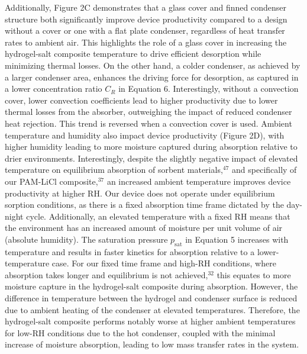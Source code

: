 \documentclass[11pt]{article}
\begin{document}
Additionally, Figure 2C demonstrates that a glass cover and finned condenser structure both significantly improve device productivity compared to a design without a cover or one with a flat plate condenser, regardless of heat transfer rates to ambient air. This highlights the role of a glass cover in increasing the hydrogel-salt composite temperature to drive efficient desorption while minimizing thermal losses. On the other hand, a colder condenser, as achieved by a larger condenser area, enhances the driving force for desorption, as captured in a lower concentration ratio $C_{R}$ in Equation 6. Interestingly, without a convection cover, lower convection coefficients lead to higher productivity due to lower thermal losses from the absorber, outweighing the impact of reduced condenser heat rejection. This trend is reversed when a convection cover is used. Ambient temperature and humidity also impact device productivity (Figure 2D), with higher humidity leading to more moisture captured during absorption relative to drier environments. Interestingly, despite the slightly negative impact of elevated temperature on equilibrium absorption of sorbent materials,$^{47}$ and specifically of our PAM-LiCl composite,$^{37}$ an increased ambient temperature improves device productivity at higher RH. Our device does not operate under equilibrium sorption conditions, as there is a fixed absorption time frame dictated by the day-night cycle. Additionally, an elevated temperature with a fixed RH means that the environment has an increased amount of moisture per unit volume of air (absolute humidity). The saturation pressure $p_{\mathrm{sat}}$ in Equation 5 increases with temperature and results in faster kinetics for absorption relative to a lower-temperature case. For our fixed time frame and high-RH conditions, where absorption takes longer and equilibrium is not achieved,$^{32}$ this equates to more moisture capture in the hydrogel-salt composite during absorption. However, the difference in temperature between the hydrogel and condenser surface is reduced due to ambient heating of the condenser at elevated temperatures. Therefore, the hydrogel-salt composite performs notably worse at higher ambient temperatures for low-RH conditions due to the hot condenser, coupled with the minimal increase of moisture absorption, leading to low mass transfer rates in the system.
\end{document}
